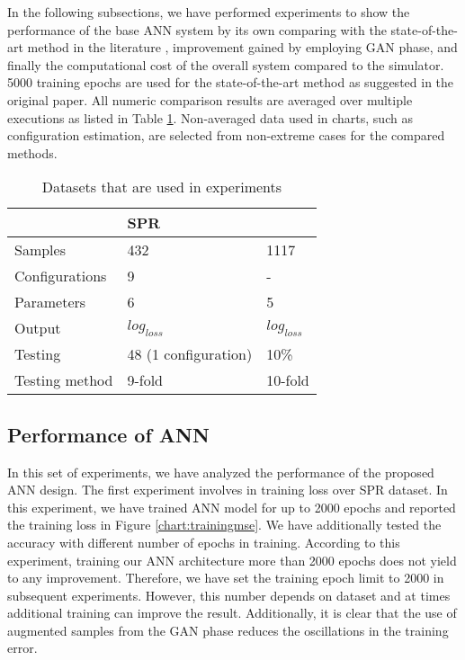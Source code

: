 \documentclass[draft, 10pt]{IEEEtran}
\begin{document}
In the following subsections, we have performed experiments to show the performance of the base ANN system by its own comparing with the state-of-the-art method in the literature \cite{paper0}, improvement gained by employing GAN phase, and finally the computational cost of the overall system compared to the simulator. 5000 training epochs are used for the state-of-the-art method as suggested in the original paper. All numeric comparison results are averaged over multiple executions as listed in Table \ref{tbl:dataset}. Non-averaged data used in charts, such as configuration estimation, are selected from non-extreme cases for the compared methods.

\begin{table}
\centering
\caption{Datasets that are used in experiments}
\begin{tabular}{l|l|l}
	~ & SPR & \dszero \\\hline
	Samples & 432 & 1117\\
	Configurations & 9 & - \\
	Parameters & 6 & 5 \\
	Output & $log_{loss}$ & $log_{loss}$ \\
	Testing & 48 (1 configuration) & 10\% \\
	Testing method & 9-fold & 10-fold \\
\end{tabular}
\label{tbl:dataset}
\end{table}


\subsection{Performance of ANN}

In this set of experiments, we have analyzed the performance of the proposed ANN design. The first experiment involves in training loss over SPR dataset. In this experiment, we have trained ANN model for up to 2000 epochs and reported the training loss in Figure \ref{chart:trainingmse}. We have additionally tested the accuracy with different number of epochs in training. According to this experiment, training our ANN architecture more than 2000 epochs does not yield to any improvement. Therefore, we have set the training epoch limit to 2000 in subsequent experiments. However, this number depends on dataset and at times additional training can improve the result. Additionally, it is clear that the use of augmented samples from the GAN phase reduces the oscillations in the training error.
\end{document}

